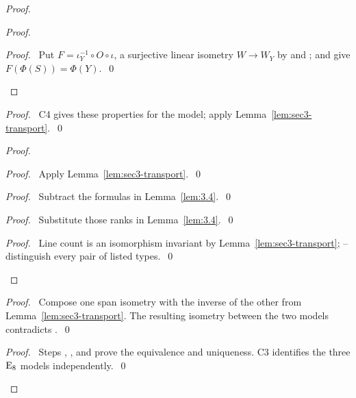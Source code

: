\begin{proof}
\begin{proof}
  \qedstep
  \begin{proof}\pf\ Put $F=\iota_Y^{-1}\circ O\circ\iota$, a surjective linear isometry
   $W\to W_Y$ by  and ;
    and  give
   $F(\Phi(S))=\Phi(Y)$.~\qed\end{proof}
 \end{proof}
 \begin{proof}\pf\ C4 gives these properties for the model; apply
  Lemma~\ref{lem:sec3-transport}.~\qed\end{proof}
 \begin{proof}
  \begin{proof}\pf\ Apply Lemma~\ref{lem:sec3-transport}.~\qed\end{proof}
  \begin{proof}\pf\ Subtract the formulas in Lemma~\ref{lem:3.4}.~\qed\end{proof}
  \begin{proof}\pf\ Substitute those ranks in Lemma~\ref{lem:3.4}.~\qed\end{proof}
  \qedstep
  \begin{proof}\pf\ Line count is an isomorphism invariant by
   Lemma~\ref{lem:sec3-transport}; --
   distinguish every pair of listed types.~\qed\end{proof}
 \end{proof}
 \begin{proof}\pf\ Compose one span isometry with the inverse of the other from
  Lemma~\ref{lem:sec3-transport}. The resulting isometry between the two models
  contradicts .~\qed\end{proof}
 \qedstep
 \begin{proof}\pf\ Steps , , and
   prove the equivalence and uniqueness. C3 identifies the
  three $\mathrm{E}_8$ models independently.~\qed\end{proof}
\end{proof}

